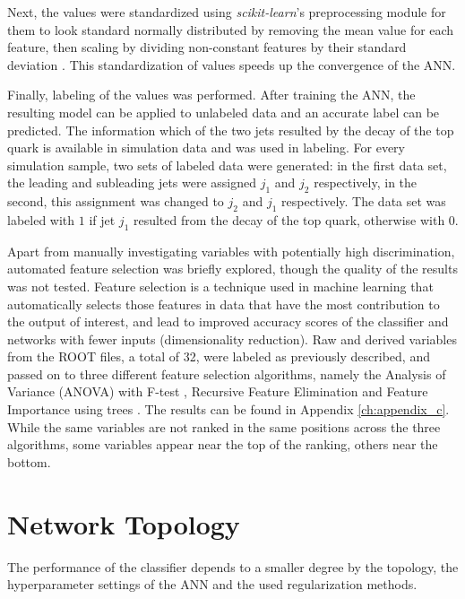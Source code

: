 Next, the values were standardized using \emph{scikit-learn}'s preprocessing module for them to look standard normally distributed by removing the mean value for each feature, then scaling by dividing non-constant features by their standard deviation \cite{scikit-learn}. This standardization of values speeds up the convergence of the ANN.

Finally, labeling of the values was performed. After training the ANN, the resulting model can be applied to unlabeled data and an accurate label can be predicted. The information which of the two jets resulted by the decay of the top quark is available in simulation data and was used in labeling. For every simulation sample, two sets of labeled data were generated: in the first data set, the leading and subleading jets were assigned $j_1$ and $j_2$ respectively, in the second, this assignment was changed to $j_2$ and $j_1$ respectively. The data set was labeled with $1$ if jet $j_1$ resulted from the decay of the top quark, otherwise with $0$.

Apart from manually investigating variables with potentially high discrimination, automated feature selection was briefly explored, though the quality of the results was not tested. Feature selection is a technique used in machine learning that automatically selects those features in data that have the most contribution to the output of interest, and lead to improved accuracy scores of the classifier and networks with fewer inputs (dimensionality reduction). Raw and derived variables from the ROOT files, a total of 32, were labeled as previously described, and passed on to three different feature selection algorithms, namely the Analysis of Variance (ANOVA) with F-test \cite{misc:anova}, Recursive Feature Elimination \cite{scikit-learn} and Feature Importance using trees \cite{scikit-learn}. The results can be found in Appendix \ref{ch:appendix_c}. While the same variables are not ranked in the same positions across the three algorithms, some variables appear near the top of the ranking, others near the bottom.

\section{Network Topology}
\label{sec:ch-4-network}

The performance of the classifier depends to a smaller degree by the topology, the hyperparameter settings of the ANN and the used regularization methods.

